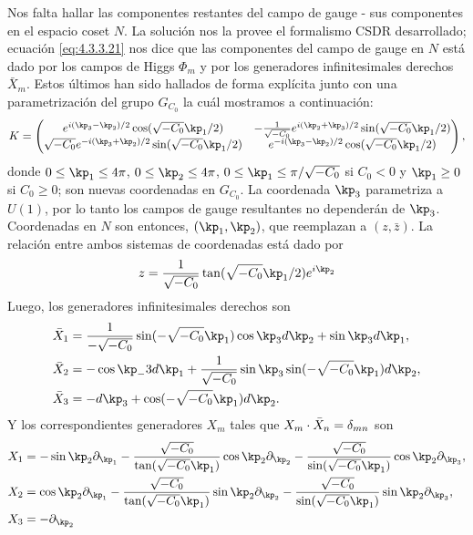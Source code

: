 Nos falta hallar las componentes restantes del campo de gauge - sus componentes en el espacio coset $N$. La solución nos la provee el formalismo CSDR desarrollado; ecuación \eqref{eq:4.3.3.21} nos dice que las componentes del campo de gauge en $N$ está dado por los campos de Higgs $\Phi_m$ y por los generadores infinitesimales derechos $\bar X_m$. Estos últimos han sido hallados de forma explícita junto con una parametrización del grupo $G_{C_0}$ la cuál mostramos a continuación:
\begin{align}
	K = \begin{pmatrix}
	e^{i(\kp_3-\kp_2)/2}\cos(\sqrt{-C_0}\kp_1/2) & -\f{1}{\sqrt{-C_0}}e^{i(\kp_2+\kp_3)/2}\sin(\sqrt{-C_0}\kp_1/2)\\
	\sqrt{-C_0}e^{-i(\kp_3+\kp_2)/2}\sin(\sqrt{-C_0}\kp_1/2) & e^{-i(\kp_3-\kp_2)/2}\cos(\sqrt{-C_0}\kp_1/2)
	\end{pmatrix},
\end{align}
donde $0\leq\kp_1\leq 4\pi$, $0\leq\kp_2\leq 4\pi$, $0\leq\kp_1\leq\pi/\sqrt{-C_0}$ si $C_0<0$ y $\kp_1\geq 0$ si $C_0\geq 0$; son nuevas coordenadas en $G_{C_0}$. La coordenada $\kp_3$ parametriza a $U(1)$, por lo tanto los campos de gauge resultantes no dependerán de $\kp_3$. Coordenadas en $N$ son entonces, $(\kp_1,\kp_2)$, que reemplazan a $(z,\bar z)$. La relación entre ambos sistemas de coordenadas está dado por
\begin{align}
	z = \f 1{\sqrt{-C_0}}\tan(\sqrt{-C_0}\kp_1/2)e^{i\kp_2} \label{eq:4.3.7.5}
\end{align}
Luego, los generadores infinitesimales derechos son
\begin{align}
	\bar X_1 &= \f{1}{-\sqrt{-C_0}}\sin(-\sqrt{-C_0}\kp_1)\cos\kp_3 d\kp_2+\sin\kp_3 d\kp_1,\\
	\bar X_2 &= -\cos\kp_-3 d\kp_1+\f 1{\sqrt{-C_0}}\sin\kp_3\sin(-\sqrt{-C_0}\kp_1)d\kp_2,\\
	\bar X_3 &= -d\kp_3+\cos(-\sqrt{-C_0}\kp_1)d\kp_2. 
\end{align}
Y los correspondientes generadores $X_m$ tales que $X_m\cdot \bar X_n=\delta_{mn}$ son
\begin{align}
	X_1 &= -\sin\kp_2\pr_{\kp_1}-\f{\sqrt{-C_0}}{\tan(\sqrt{-C_0}\kp_1)}\cos\kp_2\pr_{\kp_2}-\f{\sqrt{-C_0}}{\sin(\sqrt{-C_0}\kp_1)}\cos\kp_2\pr_{\kp_3},\\
	X_2 &= \cos\kp_2\pr_{\kp_1}-\f{\sqrt{-C_0}}{\tan(\sqrt{-C_0}\kp_1)}\sin\kp_2\pr_{\kp_2}-\f{\sqrt{-C_0}}{\sin(\sqrt{-C_0}\kp_1)}\sin\kp_2\pr_{\kp_3},\\
	X_3 &= -\pr_{\kp_2}
\end{align}
